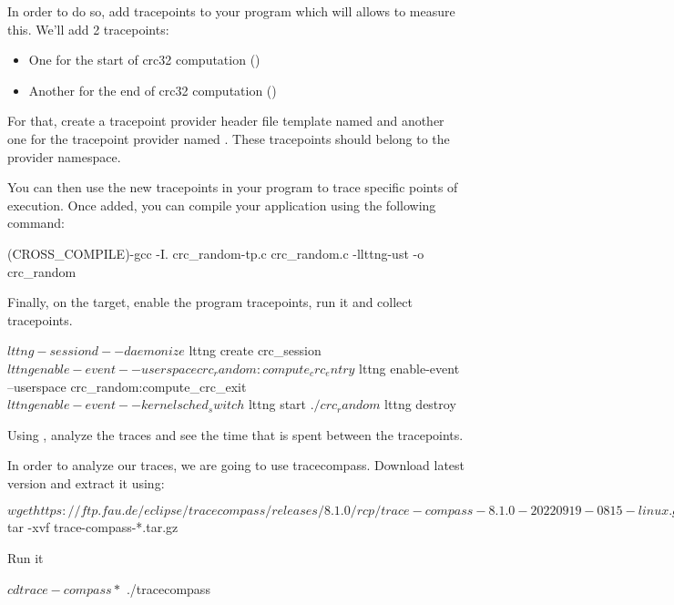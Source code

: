 In order to do so, add tracepoints to your program which will allows to measure
this. We'll add 2 tracepoints:

\begin{itemize}
  \item One for the start of crc32 computation ()
  \item Another for the end of crc32 computation ()
\end{itemize}

For that, create a tracepoint provider header file template named
 and another one for the tracepoint provider named
. These tracepoints should belong to the 
provider namespace.

You can then use the new tracepoints in your program to trace specific points
of execution. Once added, you can compile your application using the following
command:

\begin{bashinput}
$ $(CROSS_COMPILE)-gcc -I. crc_random-tp.c crc_random.c  -llttng-ust -o crc_random
\end{bashinput}

Finally, on the target, enable the program tracepoints, run it and collect
tracepoints.

\begin{bashinput}
$ lttng-sessiond --daemonize
$ lttng create crc_session
$ lttng enable-event --userspace crc_random:compute_crc_entry
$ lttng enable-event --userspace crc_random:compute_crc_exit
$ lttng enable-event --kernel sched_switch
$ lttng start
$ ./crc_random
$ lttng destroy
\end{bashinput}

Using , analyze the traces and see the time that is spent
between the tracepoints.

In order to analyze our traces, we are going to use tracecompass. Download
 latest version and extract it using:

\begin{bashinput}
$ wget https://ftp.fau.de/eclipse/tracecompass/releases/8.1.0/rcp/trace-compass-8.1.0-20220919-0815-linux.gtk.x86_64.tar.gz
$ tar -xvf trace-compass-*.tar.gz
\end{bashinput}

Run it
\begin{bashinput}
$ cd trace-compass*
$ ./tracecompass
\end{bashinput}

